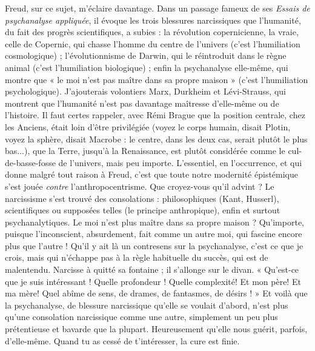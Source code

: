 Freud, sur ce sujet, m’éclaire davantage. Dans un passage fameux de ses
{\it Essais de psychanalyse appliquée}, il évoque les trois blessures narcissiques que
l’humanité, du fait des progrès scientifiques, a subies : la révolution copernicienne,
la vraie, celle de Copernic, qui chasse l’homme du centre de l’univers
(c’est l’humiliation cosmologique) ; l’évolutionnisme de Darwin, qui le réintroduit
dans le règne animal (c’est l’humiliation biologique) ; enfin la psychanalyse
elle-même, qui montre que « le moi n’est pas maître dans sa propre
maison » (c'est l’humiliation psychologique). J’ajouterais volontiers Marx,
Durkheim et Lévi-Strauss, qui montrent que l'humanité n’est pas davantage
maîtresse d’elle-même ou de l’histoire. Il faut certes rappeler, avec Rémi Brague
que la position centrale, chez les Anciens, était loin d’être privilégiée (voyez le
corps humain, disait Plotin, voyez la sphère, disait Macrobe : le centre, dans les
deux cas, serait plutôt le plus bas...), que la Terre, jusqu’à la Renaissance, est
plutôt considérée comme le cul-de-basse-fosse de l’univers, mais peu importe.
L'essentiel, en l’occurrence, et qui donne malgré tout raison à Freud, c’est que
toute notre modernité épistémique s’est jouée {\it contre} l’anthropocentrisme. Que
croyez-vous qu’il advint ? Le narcissisme s’est trouvé des consolations : philosophiques
(Kant, Husserl), scientifiques ou supposées telles (le principe anthropique),
enfin et surtout psychanalytiques. Le moi n’est plus maître dans sa
propre maison ? Qu'importe, puisque l’inconscient, absurdement, fait comme
un autre moi, qui fascine encore plus que l’autre ! Qu'il y ait là un contresens
sur la psychanalyse, c’est ce que je crois, mais qui n’échappe pas à la règle habituelle
du succès, qui est de malentendu. Narcisse à quitté sa fontaine ; il
s’allonge sur le divan. « Qu'est-ce que je suis intéressant ! Quelle profondeur !
Quelle complexité! Et mon père! Et ma mère! Quel abîme de sens, de
drames, de fantasmes, de désirs ! » Et voilà que la psychanalyse, de blessure narcissique
qu’elle se voulait d’abord, n’est plus qu’une consolation narcissique
comme une autre, simplement un peu plus prétentieuse et bavarde que la plupart.
Heureusement qu’elle nous guérit, parfois, d’elle-même. Quand tu as
cessé de t’intéresser, la cure est finie.

